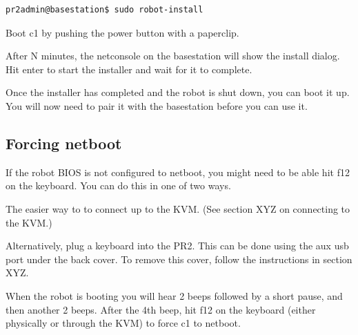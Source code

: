 \begin{verbatim}
pr2admin@basestation$ sudo robot-install
\end{verbatim}

Boot c1 by pushing the power button with a paperclip.

After N minutes, the netconsole on the basestation will show the
install dialog.  Hit enter to start the installer and wait for it to
complete.

Once the installer has completed and the robot is shut down, you can
boot it up.  You will now need to pair it with the basestation before
you can use it.

\subsection{Forcing netboot}

If the robot BIOS is not configured to netboot, you might need to be
able hit f12 on the keyboard.  You can do this in one of two ways.

The easier way to to connect up to the KVM.  (See section XYZ on connecting to the KVM.)

Alternatively, plug a keyboard into the PR2.  This can be done using
the aux usb port under the back cover.  To remove this cover, follow
the instructions in section XYZ.

When the robot is booting you will hear 2 beeps followed by a short
pause, and then another 2 beeps.  After the 4th beep, hit f12 on the
keyboard (either physically or through the KVM) to force c1 to netboot.

